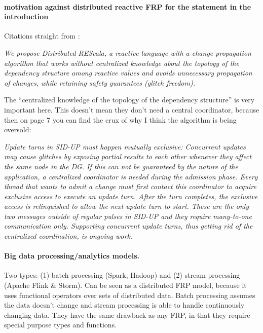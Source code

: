 \paragraph{motivation against distributed reactive FRP for the statement in the introduction}
Citations straight from \cite{drescala}:

\emph{We propose Distributed REScala, a reactive language
with a change propagation algorithm that works without
centralized knowledge about the topology of the dependency
structure among reactive values and avoids unnecessary
propagation of changes, while retaining safety guarantees
(glitch freedom).}

The ``centralized knowledge of the topology of the dependency structure'' is very important here. This doesn't mean they don't need a central coordinator, because then on page 7 you can find the crux of why I think the algorithm is being oversold:

\emph{Update turns in SID-UP must happen mutually exclusive:
Concurrent updates may cause glitches by exposing partial
results to each other whenever they affect the same node in
the DG. If this can not be guaranteed by the nature of the
application, a centralized coordinator is needed during the
admission phase. Every thread that wants to admit a change
must first contact this coordinator to acquire exclusive access
to execute an update turn. After the turn completes, the
exclusive access is relinquished to allow the next update turn
to start. These are the only two messages outside of regular
pulses in SID-UP and they require many-to-one communication
only. Supporting concurrent update turns, thus getting
rid of the centralized coordination, is ongoing work.}


\paragraph{Big data processing/analytics models.} Two types: (1) batch processing (Spark, Hadoop) \cite{mapreduce} and (2) stream processing (Apache Flink \& Storm). Can be seen as a  distributed FRP model, because it uses functional operators over sets of distributed data. Batch processing assumes the data doesn't change and stream processing is able to handle continuously changing data. They have the same drawback as any FRP, in that they require special purpose types and functions.


